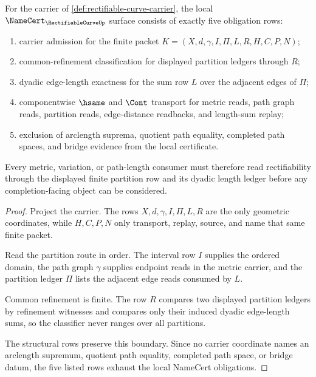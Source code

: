 \begin{theorem}
\label{thm:rectifiable-curve-namecert-obligations}
For the carrier of \autoref{def:rectifiable-curve-carrier}, the local $\NameCert_{\RectifiableCurveUp}$ surface consists of exactly five obligation rows:
\begin{enumerate}
\item carrier admission for the finite packet $K=(X,d,\gamma,I,\Pi,L,R,H,C,P,N)$;
\item common-refinement classification for displayed partition ledgers through $R$;
\item dyadic edge-length exactness for the sum row $L$ over the adjacent edges of $\Pi$;
\item componentwise $\hsame$ and $\Cont$ transport for metric reads, path graph reads, partition reads, edge-distance readbacks, and length-sum replay;
\item exclusion of arclength suprema, quotient path equality, completed path spaces, and bridge evidence from the local certificate.
\end{enumerate}
Every metric, variation, or path-length consumer must therefore read rectifiability through the displayed finite partition row and its dyadic length ledger before any completion-facing object can be considered.
\end{theorem}
\begin{proof}
Project the carrier. The rows $X,d,\gamma,I,\Pi,L,R$ are the only geometric coordinates, while $H,C,P,N$ only transport, replay, source, and name that same finite packet.

Read the partition route in order. The interval row $I$ supplies the ordered domain, the path graph $\gamma$ supplies endpoint reads in the metric carrier, and the partition ledger $\Pi$ lists the adjacent edge reads consumed by $L$.

Common refinement is finite. The row $R$ compares two displayed partition ledgers by refinement witnesses and compares only their induced dyadic edge-length sums, so the classifier never ranges over all partitions.

The structural rows preserve this boundary. Since no carrier coordinate names an arclength supremum, quotient path equality, completed path space, or bridge datum, the five listed rows exhaust the local NameCert obligations.
\end{proof}


